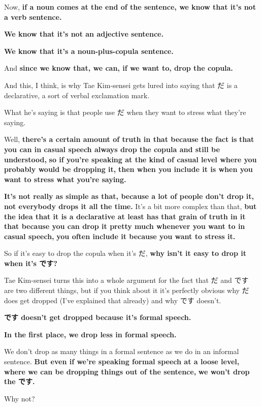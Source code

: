 \thinrule

Now, {\bf if a noun comes at the end of the sentence, we know that it's not a verb sentence.}

{\bf We know that it's not an adjective sentence.}

{\bf We know that it's a noun-plus-copula sentence.}

And {\bf since we know that, we can, if we want to, drop the copula.}

And this, I think, is why Tae Kim-sensei gets lured into saying that だ is a declarative, a sort of verbal exclamation mark.

What he's saying is that people use だ when they want to stress what they're saying.

Well, {\bf there's a certain amount of truth in that because the fact is} {\bf that you can in casual speech always drop the copula and still be understood,} {\bf so if you're speaking at the kind of casual level where you probably would be dropping it,} {\bf then when you include it is when you want to stress what you're saying.}

\thinrule

{\bf It's not really as simple as that, because a lot of people don't drop it,} {\bf not everybody drops it all the time.} It's a bit more complex than that, {\bf but the idea that it is a declarative at least has that grain of truth in it} {\bf that because you can drop it pretty much whenever you want to in casual speech,} {\bf you often include it because you want to stress it.}

So if it's easy to drop the copula when it's だ, {\bf why isn't it easy to drop it when it's です?}

Tae Kim-sensei turns this into a whole argument for the fact that だ and です are two different things, but if you think about it it's perfectly obvious why だ does get dropped (I've explained that already) and why です doesn't.

{\bf です doesn't get dropped because it's formal speech.}

{\bf In the first place, we drop less in formal speech.}

{}

We don't drop as many things in a formal sentence as we do in an informal sentence. {\bf But even if we're speaking formal speech at a loose level,} {\bf where we can be dropping things out of the sentence,} {\bf we won't drop the です.}

Why not?

